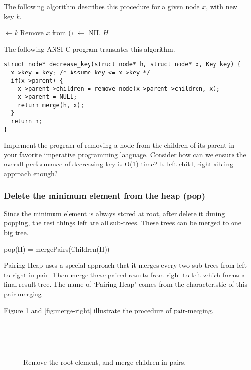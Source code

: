 \documentclass{article}
\begin{document}
The following algorithm describes this procedure for a given node $x$, with
new key $k$.

\begin{algorithmic}[1]
  \State {} $\gets k$
    \State Remove $x$ from ()
     $\gets$ NIL
    \State \Return {}
  \EndIf
  \State \Return $H$
\EndFunction
\end{algorithmic}

The following ANSI C program translates this algorithm.

\lstset{language=C}
\begin{lstlisting}
struct node* decrease_key(struct node* h, struct node* x, Key key) {
  x->key = key; /* Assume key <= x->key */
  if(x->parent) {
    x->parent->children = remove_node(x->parent->children, x);
    x->parent = NULL;
    return merge(h, x);
  }
  return h;
}
\end{lstlisting}

\begin{Exercise}
Implement the program of removing a node from the children of its
parent in your favorite imperative programming language. Consider
how can we ensure the overall performance of decreasing key is
O(1) time? Is left-child, right sibling approach enough?
\end{Exercise}

\subsubsection{Delete the minimum element from the heap (pop)}
 
Since the minimum element is always stored at root, after delete it
during popping, the rest things left are all sub-trees. These trees
can be merged to one big tree.

\be
  pop(H) = mergePairs(Children(H))
\ee

Pairing Heap uses a special approach that it merges every two sub-trees
from left to right in pair. Then
merge these paired results from right to left which forms a final
result tree. The name of `Pairing Heap' comes from the characteristic
of this pair-merging.

Figure \ref{fig:merge-pairs} and \ref{fig:merge-right} illustrate the procedure of pair-merging.

\begin{figure}[htbp]
  \centering
   \\
   \\
   \\
  \caption{Remove the root element, and merge children in pairs.} \label{fig:merge-pairs}
\end{figure}
\end{document}
